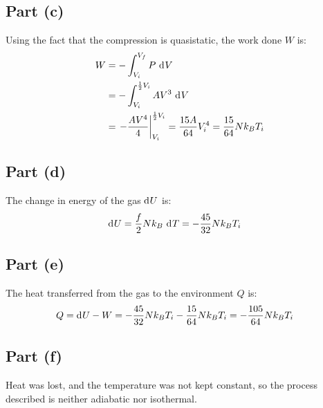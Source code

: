 \documentclass{article}
\begin{document}
\subsection*{Part (c)}
Using the fact that the compression is quasistatic, the work done $W$ is:
\begin{equation}
    \begin{split}
        W & = -\int_{V_i}^{V_f} P \, \diff{V} \\
        & = -\int_{V_i}^{\frac{1}{2}V_i} AV^3 \, \diff{V} \\
        & = \left.-\frac{AV^4}{4}\right\vert_{V_i}^{\frac{1}{2}V_i} = \frac{15A}{64}V_i^4 = \frac{15}{64}Nk_B T_i
    \end{split}
\end{equation}
\subsection*{Part (d)}
The change in energy of the gas $\diff{U}$ is:
\begin{equation}
    \begin{split}
        \diff{U} & = \frac{f}{2}Nk_B \, \diff{T} = -\frac{45}{32}Nk_B T_i
    \end{split}
\end{equation}
\subsection*{Part (e)}
The heat transferred from the gas to the environment $Q$ is:
\begin{equation}
    \begin{split}
        Q = \diff{U} - W & = -\frac{45}{32}Nk_B T_i - \frac{15}{64}Nk_B T_i = -\frac{105}{64}Nk_B T_i
    \end{split}
\end{equation}
\subsection*{Part (f)}
Heat was lost, and the temperature was not kept constant, so the process described is neither adiabatic nor isothermal.
\end{document}
